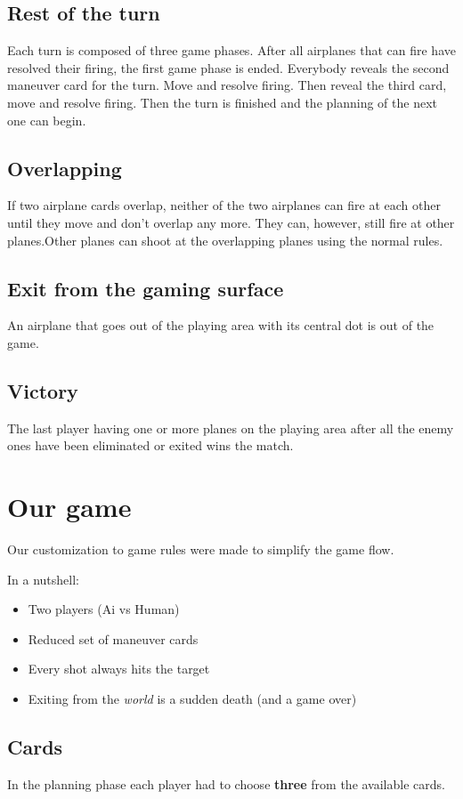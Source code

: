 \documentclass[12pt]{report}
\begin{document}
\subsection{Rest of the turn}
Each turn is composed of three game phases. After all airplanes that can fire have resolved their firing, the first game phase is ended. Everybody reveals the second maneuver card for the  turn. Move and resolve firing. Then reveal the third card, move  and resolve firing. Then the turn is finished and the planning  of the next one can begin.
\subsection{Overlapping}
If two airplane cards overlap, neither of the two airplanes can fire at each other until they move and don’t overlap any more. They can, however, still fire at other planes.Other planes can shoot at the overlapping planes using the normal rules.
\subsection{Exit from the gaming surface}
An airplane that goes out of the playing area with its central dot is out of the game.
\subsection{Victory}
The last player having one or more planes on the playing area after all the enemy ones have been eliminated or exited wins the match.

\section{Our game}
\label{modify this name} 
Our customization to game rules were made to simplify the game flow.

In a nutshell:
\begin{itemize}
    \item Two players (Ai vs Human)
    \item Reduced set of maneuver cards 
    \item Every shot always hits the target
    \item Exiting from the \textit{world} is a sudden death (and a game over)           
\end{itemize}

\subsection{Cards}
In the planning phase each player had to choose \textbf{three} from the available cards.
\end{document}
